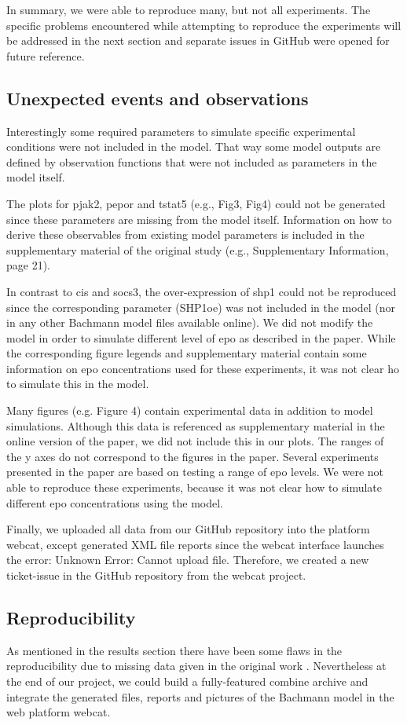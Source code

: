 In summary, we were able to reproduce many, but not all experiments. The specific problems encountered while attempting to reproduce the experiments will be addressed in the next section and separate issues in GitHub were opened for future reference.


\subsection*{Unexpected events and observations}
Interestingly some required parameters to simulate specific experimental conditions were not included in the model. That way some model outputs are defined by observation functions that were not included as parameters in the model itself. 

The plots for \ac{pjak}2, \ac{pepor} and t\ac{stat}5 (e.g., Fig3, Fig4) could not be generated since these parameters are missing from the model itself. Information on how to derive these observables from existing model parameters is included in the supplementary material of the original study (e.g., Supplementary Information, page 21). 

In contrast to \ac{cis} and \ac{socs}3, the over-expression of \ac{shp1} could not be reproduced since the corresponding parameter (SHP1oe) was not included in the model (nor in any other Bachmann model files available online). We did not modify the model in order to simulate different level of \ac{epo} as described in the paper. While the corresponding figure legends and supplementary material contain some information on \ac{epo} concentrations used for these experiments, it was not clear ho to simulate this in the model.

Many figures (e.g. Figure 4) contain experimental data in addition to model simulations. Although this data is referenced as supplementary material in the online version of the paper, we did not include this in our plots. The ranges of the y axes do not correspond to the figures in the paper. 
Several experiments presented in the paper are based on testing a range of \ac{epo} levels. We were not able to reproduce these experiments, because it was not clear how to simulate different \ac{epo} concentrations using the model.

Finally, we uploaded all data from our GitHub repository into the platform \ac{webcat}, except generated XML file reports since the \ac{webcat} interface launches the error: \textsf{Unknown Error: Cannot upload file}. Therefore, we created a new ticket-issue in the GitHub repository from the \ac{webcat} project.

\subsection*{Reproducibility}
As mentioned in the results section there have been some flaws in the reproducibility due to missing data given in the original work \cite{bachmannmodel}. Nevertheless at the end of our project, we could build a fully-featured \ac{combine} archive and integrate the generated files, reports and pictures of the Bachmann model in the web platform \ac{webcat}.